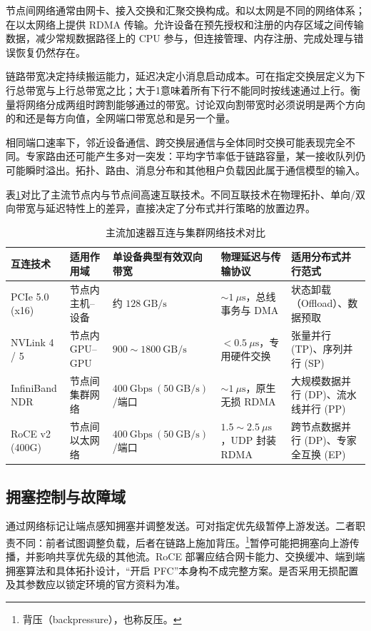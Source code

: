 \documentclass[../textbook.tex]{subfiles}
\begin{document}
节点间网络通常由网卡、接入交换和汇聚交换构成。和以太网是不同的网络体系；在以太网络上提供 RDMA 传输。允许设备在预先授权和注册的内存区域之间传输数据，减少常规数据路径上的 CPU 参与，但连接管理、内存注册、完成处理与错误恢复仍然存在。

链路带宽决定持续搬运能力，延迟决定小消息启动成本。可在指定交换层定义为下行总带宽与上行总带宽之比；大于1意味着所有下行不能同时按线速通过上行。衡量将网络分成两组时跨割能够通过的带宽。讨论双向割带宽时必须说明是两个方向的和还是每方向值，全网端口带宽总和是另一个量。

相同端口速率下，邻近设备通信、跨交换层通信与全体同时交换可能表现完全不同。专家路由还可能产生多对一突发：平均字节率低于链路容量，某一接收队列仍可能瞬时溢出。拓扑、路由、消息分布和其他租户负载因此属于通信模型的输入。

表\ref{tab:infra-interconnect}对比了主流节点内与节点间高速互联技术。不同互联技术在物理拓扑、单向/双向带宽与延迟特性上的差异，直接决定了分布式并行策略的放置边界。

\begin{table}[htbp]
\centering
\caption{主流加速器互连与集群网络技术对比}\label{tab:infra-interconnect}
\begin{tabularx}{\linewidth}{@{}lXXXX@{}}
\toprule
互连技术 & 适用作用域 & 单设备典型有效双向带宽 & 物理延迟与传输协议 & 适用分布式并行范式 \\
\midrule
PCIe 5.0 (x16) & 节点内主机--设备 & 约 $128\ \mathrm{GB/s}$ & $\sim 1\ \mu\mathrm{s}$，总线事务与 DMA & 状态卸载（Offload）、数据预取 \\
NVLink 4 / 5 & 节点内 GPU--GPU & $900\sim 1800\ \mathrm{GB/s}$ & $<0.5\ \mu\mathrm{s}$，专用硬件交换 & 张量并行 (TP)、序列并行 (SP) \\
InfiniBand NDR & 节点间集群网络 & $400\ \mathrm{Gbps}\ (50\ \mathrm{GB/s})$/端口 & $\sim 1\ \mu\mathrm{s}$，原生无损 RDMA & 大规模数据并行 (DP)、流水线并行 (PP) \\
RoCE v2 (400G) & 节点间以太网络 & $400\ \mathrm{Gbps}\ (50\ \mathrm{GB/s})$/端口 & $1.5\sim 2.5\ \mu\mathrm{s}$，UDP 封装 RDMA & 跨节点数据并行 (DP)、专家全互换 (EP) \\
\bottomrule
\end{tabularx}
\end{table}

\subsection{拥塞控制与故障域}
通过网络标记让端点感知拥塞并调整发送。可对指定优先级暂停上游发送。二者职责不同：前者试图调整负载，后者在链路上施加背压。\footnote{背压（backpressure），也称反压。}暂停可能把拥塞向上游传播，并影响共享优先级的其他流。RoCE 部署应结合网卡能力、交换缓冲、端到端拥塞算法和具体拓扑设计，“开启 PFC”本身构不成完整方案。是否采用无损配置及其参数应以锁定环境的官方资料为准。\cite{nvidia2026roce}
\end{document}
